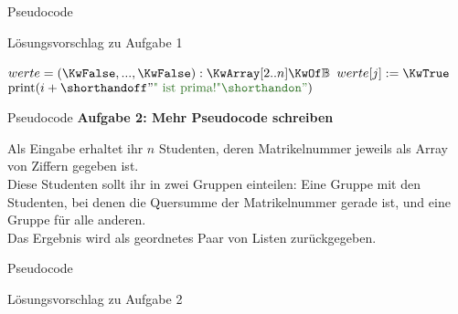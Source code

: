 
\begin{frame}{Pseudocode}
	\begin{exampleblock}{Lösungsvorschlag zu Aufgabe 1}
		\begin{algorithm}[H]
			$werte = (\KwFalse,...,\KwFalse) : \KwArray[2..n] \KwOf \BB $\;
			 {
				 {
					 {
						$werte[j] := \KwTrue$\;
					}
				}
			}
			 {
				 {
					$\|print|(i + \str{ ist prima!})$\;
				}
			}
		\end{algorithm}
	\end{exampleblock}
\end{frame}


\begin{frame}{Pseudocode}
	\textbf{Aufgabe 2: Mehr Pseudocode schreiben} \\
	\medskip
	
	Als Eingabe erhaltet ihr $n$ Studenten, deren Matrikelnummer jeweils als Array von Ziffern gegeben ist.\\
	Diese Studenten sollt ihr in zwei Gruppen einteilen: Eine Gruppe mit den Studenten, bei denen die  Quersumme der Matrikelnummer gerade ist, und eine Gruppe für alle anderen.\\
	Das Ergebnis wird als geordnetes Paar von Listen zurückgegeben.
\end{frame}

\begin{frame}{Pseudocode}
	\begin{exampleblock}{Lösungsvorschlag zu Aufgabe 2}
		\begin{algorithm}[H]
		\end{algorithm}
	\end{exampleblock}
\end{frame}


